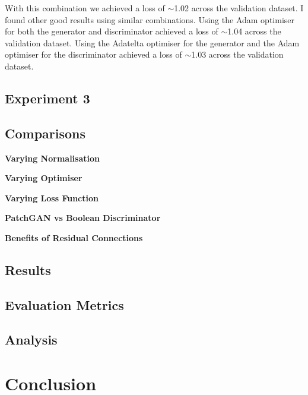 \documentclass{UoYCSproject}
\begin{document}
With this combination we achieved a loss of \(\sim\)1.02 across the validation dataset. I found other good results using similar combinations. Using the Adam optimiser for both the generator and discriminator achieved a loss of \(\sim\)1.04 across the validation dataset. Using the Adatelta optimiser for the generator and the Adam optimiser for the discriminator achieved a loss of \(\sim\)1.03 across the validation dataset.



\section{Experiment 3}

\section{Comparisons}

\textbf{Varying Normalisation}

\textbf{Varying Optimiser}

\textbf{Varying Loss Function}

\textbf{PatchGAN vs Boolean Discriminator}

\textbf{Benefits of Residual Connections}

\section{Results}

\section{Evaluation Metrics}

\section{Analysis}


\newpage{}

\chapter{Conclusion}


\newpage{}

\printbibliography
\end{document}
